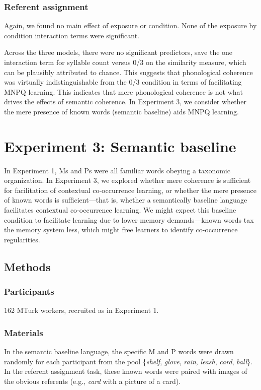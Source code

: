 \documentclass[man,floatsintext]{apa6}
\begin{document}
\subsubsection{Referent assignment}
Again, we found no main effect of exposure or condition. None of the exposure by condition interaction terms were significant.

Across the three models, there were no significant predictors, save the one interaction term for syllable count versus 0/3 on the similarity measure, which can be plausibly attributed to chance. This suggests that phonological coherence was virtually indistinguishable from the 0/3 condition in terms of facilitating MNPQ learning. This indicates that mere phonological coherence is not what drives the effects of semantic coherence. In Experiment 3, we consider whether the mere presence of known words (semantic baseline) aids MNPQ learning.

\section{Experiment 3: Semantic baseline}

In Experiment 1, Ms and Ps were all familiar words obeying a taxonomic organization. In Experiment 3, we explored whether mere coherence is sufficient for facilitation of contextual co-occurrence learning, or whether the mere presence of known words is sufficient---that is, whether a semantically baseline language facilitates contextual co-occurrence learning. We might expect this baseline condition to facilitate learning due to lower memory demands---known words tax the memory system less, which might free learners to identify co-occurrence regularities.

\subsection{Methods}
\subsubsection{Participants}
162 MTurk workers, recruited as in Experiment 1.

\subsubsection{Materials}
In the semantic baseline language, the specific M and P words were drawn randomly for each participant from the pool \{\emph{shelf}, \emph{glove}, \emph{rain}, \emph{leash}, \emph{card}, \emph{ball}\}. In the referent assignment task, these known words were paired with images of the obvious referents (e.g., \emph{card} with a picture of a card).
\end{document}
